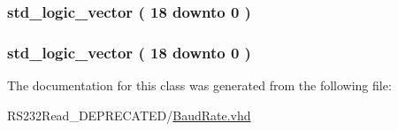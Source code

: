 \subsubsection[{Qn}]{ {\bfseries \textcolor{comment}{std\+\_\+logic\+\_\+vector}\textcolor{vhdlchar}{ }\textcolor{vhdlchar}{(}\textcolor{vhdlchar}{ }\textcolor{vhdlchar}{ } \textcolor{vhdldigit}{18} \textcolor{vhdlchar}{ }\textcolor{keywordflow}{downto}\textcolor{vhdlchar}{ }\textcolor{vhdlchar}{ } \textcolor{vhdldigit}{0} \textcolor{vhdlchar}{ }\textcolor{vhdlchar}{)}\textcolor{vhdlchar}{ }} \hspace{0.3cm}{\ttfamily [Signal]}}\label{class_baud_rate_1_1simple_a4918b47ab83d6ff869ec1a9bda3866dd}
\hypertarget{class_baud_rate_1_1simple_a193e599da42febaea5351ec3bb05dc52}{}
\subsubsection[{Qp}]{ {\bfseries \textcolor{comment}{std\+\_\+logic\+\_\+vector}\textcolor{vhdlchar}{ }\textcolor{vhdlchar}{(}\textcolor{vhdlchar}{ }\textcolor{vhdlchar}{ } \textcolor{vhdldigit}{18} \textcolor{vhdlchar}{ }\textcolor{keywordflow}{downto}\textcolor{vhdlchar}{ }\textcolor{vhdlchar}{ } \textcolor{vhdldigit}{0} \textcolor{vhdlchar}{ }\textcolor{vhdlchar}{)}\textcolor{vhdlchar}{ }} \hspace{0.3cm}{\ttfamily [Signal]}}\label{class_baud_rate_1_1simple_a193e599da42febaea5351ec3bb05dc52}


The documentation for this class was generated from the following file\+:\begin{DoxyCompactItemize}
\item 
R\+S232\+Read\+\_\+\+D\+E\+P\+R\+E\+C\+A\+T\+E\+D/\hyperlink{_r_s232_read___d_e_p_r_e_c_a_t_e_d_2_baud_rate_8vhd}{Baud\+Rate.\+vhd}\end{DoxyCompactItemize}
